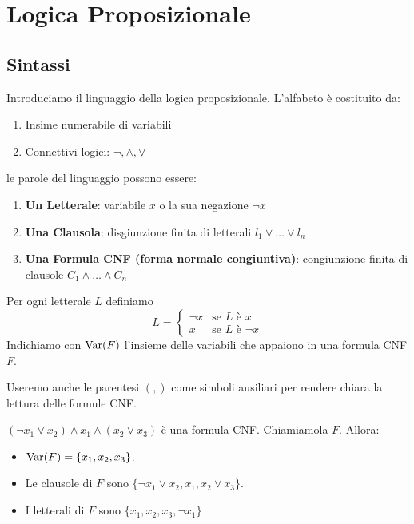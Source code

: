 \documentclass[../main.tex]{subfiles}
\begin{document}
\chapter{Logica Proposizionale}
\section{Sintassi}
Introduciamo il linguaggio della logica proposizionale. L'alfabeto è costituito da:
\begin{enumerate}
    \item Insime numerabile di variabili
    \item Connettivi logici: $\neg, \land, \lor$
\end{enumerate}
le parole del linguaggio possono essere:
\begin{enumerate}
    \item \textbf{Un Letterale}: variabile $x$ o la sua negazione $\neg x$
    \item \textbf{Una Clausola}: disgiunzione finita di letterali $l_1 \lor \ldots \lor l_n$
    \item \textbf{Una Formula CNF (forma normale congiuntiva)}: congiunzione finita di clausole $C_1 \land \ldots \land C_n$
\end{enumerate}
Per ogni letterale $L$ definiamo
\begin{equation*}
    \overline{L} = \begin{cases}
        \neg x & \text{se } L \text{ è } x      \\
        x      & \text{se } L \text{ è } \neg x
    \end{cases}
\end{equation*}
Indichiamo con $\operatorname{Var} (F)$ l'insieme delle variabili che appaiono in una formula CNF $F$.

Useremo anche le parentesi $(,)$ come simboli ausiliari per rendere chiara la lettura delle formule CNF.
\begin{example}
    $(\neg x_1 \lor x_2) \land x_1 \land (x_2 \lor x_3)$ è una formula CNF. Chiamiamola $F$. Allora:
    \begin{itemize}
        \item $\operatorname{Var} (F)=\{x_1,x_2,x_3\}$.
        \item Le clausole di $F$ sono $\{\neg x_1 \lor x_2, x_1, x_2 \lor x_3\}$.
        \item I letterali di $F$ sono $\{x_1, x_2, x_3, \neg x_1 \}$
    \end{itemize}
\end{example}
\end{document}
